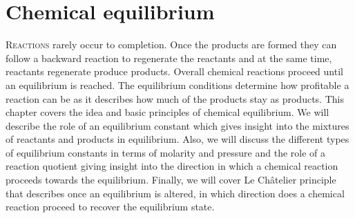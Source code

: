 \documentclass[main.tex]{subfiles}
\begin{document}
\linenumbers
  
\chapter[Chemical equilibrium]{Chemical equilibrium}


      \begin{marginfigure}
\end{marginfigure}


\lettrine[lines=4]{\color{black!45}R}{eactions} rarely occur to completion. Once the products are formed they can follow a backward reaction to regenerate the reactants and at the same time, reactants regenerate produce products. Overall chemical reactions proceed until an equilibrium is reached. The equilibrium conditions determine how profitable a reaction can be as it describes how much of the products stay as products. This chapter covers the idea and basic principles of chemical equilibrium. We will describe the role of an equilibrium constant which gives insight into the mixtures of reactants and products in equilibrium. Also, we will discuss the different types of equilibrium constants in terms of molarity and pressure and the role of a reaction quotient giving insight into the direction in which a chemical reaction proceeds towards the equilibrium. Finally, we will cover  Le Ch\^{a}telier principle that describes once an equilibrium is altered, in which direction does a chemical reaction proceed to recover the equilibrium state.
 
\end{document}

